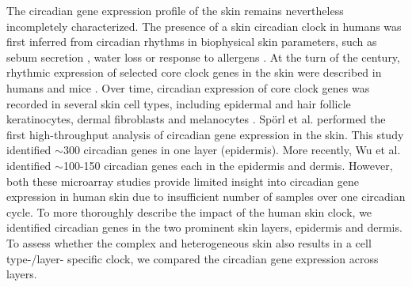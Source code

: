The circadian gene expression profile of the skin remains nevertheless incompletely characterized. The presence of a skin circadian clock in humans was first inferred from circadian rhythms in biophysical skin parameters, such as sebum secretion \cite{Burton1970}, water loss \cite{Spruit1971} or response to allergens \cite{Reinberg1965}. At the turn of the century, rhythmic expression of selected core clock genes in the skin were described in humans \cite{Bjarnason2001} and mice \cite{Oishi2002}. Over time, circadian expression of core clock genes was recorded in several skin cell types, including epidermal and hair follicle keratinocytes, dermal fibroblasts and melanocytes \cite{Zanello2000, Kawara2002, Brown2005, Brown2008,Spoerl2011}. Sp\"orl et al. \cite{Spoerl2012} performed the first high-throughput analysis of circadian gene expression in the skin. This study identified $\sim$300 circadian genes in one layer (epidermis). More recently, Wu et al. \cite{Wu2018,Wu2020} identified $\sim$100-150 circadian genes each in the epidermis and dermis. However, both these microarray studies provide limited insight into circadian gene expression in human skin due to insufficient number of samples over one circadian cycle. To more thoroughly describe the impact of the human skin clock, we identified circadian genes in the two prominent skin layers, epidermis and dermis. To assess whether the complex and heterogeneous skin also results in a cell type-/layer- specific clock, we compared the circadian gene expression across layers. 

